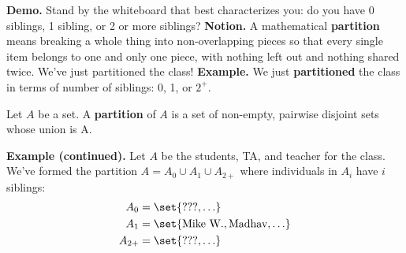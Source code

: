 \documentclass[10pt]{beamer}
\begin{document}
\begin{frame}
\small 
\colorbox{yellow!30}{\textbf{Demo.}} Stand by the whiteboard that best characterizes you: do you have 0 siblings, 1 sibling, or 2 or more siblings?
\pause 
\vfill
\colorbox{blue!30}{\textbf{Notion.}} A mathematical \textbf{partition} means breaking a whole thing into non-overlapping pieces so that every single item belongs to one and only one piece, with nothing left out and nothing shared twice.
We've just partitioned the class!
\pause 
\vfill 
\colorbox{green!30}{\textbf{Example.}} We just \textbf{partitioned} the class in terms of number of siblings: 0, 1, or $2^+$.
\pause 
\vfill 

\begin{mygreenbox}[title=Definition]
Let $A$ be a set.  A \textbf{partition} of $A$ is a set of non-empty, pairwise disjoint sets whose union is A. 
\end{mygreenbox}

\pause 
\vfill 
\colorbox{green!30}{\textbf{Example (continued).}} Let $A$ be the students, TA, and teacher for the class.  We've formed the partition $A= A_0 \cup A_1 \cup A_{2+}$ where individuals in $A_i$ have $i$ siblings:
\begin{align*}
A_0 &= \set{???, \hdots} \\
A_1 &= \set{\text{Mike W.}, \text{Madhav}, \hdots} \\
A_{2+} &= \set{???, \hdots} \\	
\end{align*}


\end{frame}
\end{document}
